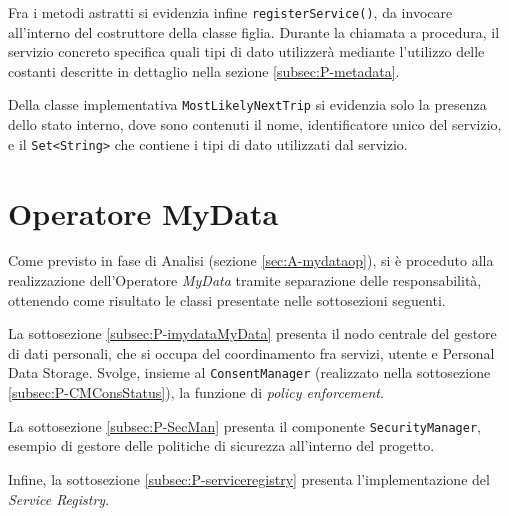 Fra i metodi astratti si evidenzia infine \texttt{registerService()}, da invocare all’interno del costruttore della classe figlia. Durante la chiamata a procedura, il servizio concreto specifica quali tipi di dato utilizzer\`a mediante l’utilizzo delle costanti descritte in dettaglio nella sezione \ref{subsec:P-metadata}.

Della classe implementativa \texttt{MostLikelyNextTrip} si evidenzia solo la presenza dello stato interno, dove sono contenuti il nome, identificatore unico del servizio, e il \texttt{Set<String>} che contiene i tipi di dato utilizzati dal servizio.

\section{Operatore MyData}
Come previsto in fase di Analisi (sezione \ref{sec:A-mydataop}), si \`e proceduto alla realizzazione dell'Operatore \textit{MyData} tramite separazione delle responsabilit\`a, ottenendo come risultato le classi presentate nelle sottosezioni seguenti.

La sottosezione \ref{subsec:P-imydataMyData} presenta il nodo centrale del gestore di dati personali, che si occupa del coordinamento fra servizi, utente e Personal Data Storage. Svolge, insieme al \texttt{ConsentManager} (realizzato nella sottosezione \ref{subsec:P-CMConsStatus}), la funzione di \textit{policy enforcement}.

La sottosezione \ref{subsec:P-SecMan} presenta il componente \texttt{SecurityManager}, esempio di gestore delle politiche di sicurezza all'interno del progetto.

Infine, la sottosezione \ref{subsec:P-serviceregistry} presenta l'implementazione del \textit{Service Registry}.

